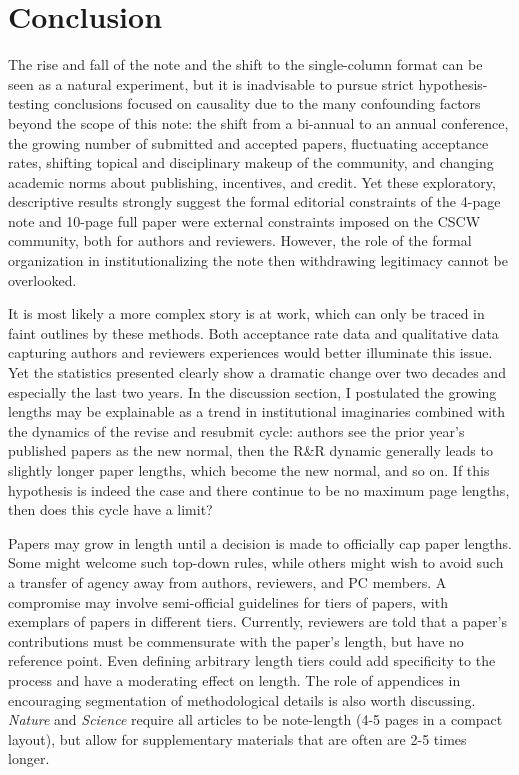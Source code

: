 \documentclass[format=acmsmall, screen=true]{acmart}
\begin{document}
\section{Conclusion}

The rise and fall of the note and the shift to the single-column format can be seen as a natural experiment, but it is inadvisable to pursue strict hypothesis-testing conclusions focused on causality due to the many confounding factors beyond the scope of this note: the shift from a bi-annual to an annual conference, the growing number of submitted and accepted papers, fluctuating acceptance rates, shifting topical and disciplinary makeup of the community, and changing academic norms about publishing, incentives, and credit. Yet these exploratory, descriptive results strongly suggest the formal editorial constraints of the 4-page note and 10-page full paper were external constraints imposed on the CSCW community, both for authors and reviewers. However, the role of the formal organization in institutionalizing the note then withdrawing legitimacy cannot be overlooked. 

It is most likely a more complex story is at work, which can only be traced in faint outlines by these methods. Both acceptance rate data and qualitative data capturing authors and reviewers experiences would better illuminate this issue. Yet the statistics presented clearly show a dramatic change over two decades and especially the last two years. In the discussion section, I postulated the growing lengths may be explainable as a trend in institutional imaginaries combined with the dynamics of the revise and resubmit cycle: authors see the prior year's published papers as the new normal, then the R\&R dynamic generally leads to slightly longer paper lengths, which become the new normal, and so on. If this hypothesis is indeed the case and there continue to be no maximum page lengths, then does this cycle have a limit?

Papers may grow in length until a decision is made to officially cap paper lengths. Some might welcome such top-down rules, while others might wish to avoid such a transfer of agency away from authors, reviewers, and PC members. A compromise may involve semi-official guidelines for tiers of papers, with exemplars of papers in different tiers. Currently, reviewers are told that a paper's contributions must be commensurate with the paper's length, but have no reference point. Even defining arbitrary length tiers could add specificity to the process and have a moderating effect on length. The role of appendices in encouraging segmentation of methodological details is also worth discussing. \textit{Nature} and \textit{Science} require all articles to be note-length (4-5 pages in a compact layout), but allow for supplementary materials that are often are 2-5 times longer.
\end{document}
